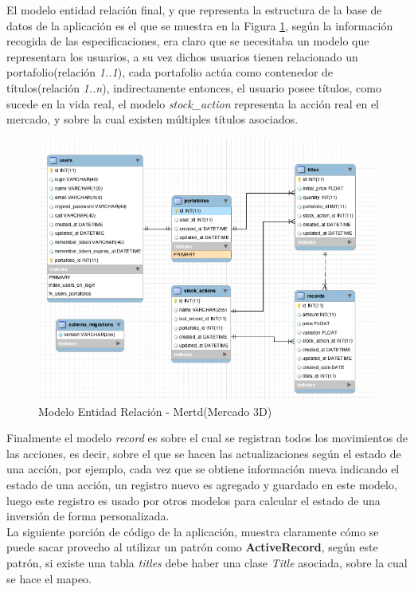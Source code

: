 El modelo entidad relación final, y que representa la estructura de la base de datos de la aplicación es el que se muestra en la Figura \ref{fig:erd}, según la información recogida de las especificaciones, era claro que se necesitaba un modelo que representara los usuarios, a su vez dichos usuarios tienen relacionado un portafolio(relación \emph{1..1}), cada portafolio actúa como contenedor de títulos(relación \emph{1..n}), indirectamente entonces, el usuario posee títulos, como sucede en la vida real, el modelo \emph{stock\_action} representa la acción real en el mercado, y sobre la cual existen múltiples títulos asociados.

\begin{figure}[h]
	\centering
		\includegraphics[scale=0.4]{erb_mertd.jpg}
		\caption{Modelo Entidad Relación - Mertd(Mercado 3D)}
	\label{fig:erd}
\end{figure}

Finalmente el modelo \emph{record} es sobre el cual se registran todos los movimientos de las acciones, es decir, sobre el que se hacen las actualizaciones según el estado de una acción, por ejemplo, cada vez que se obtiene información nueva indicando el estado de una acción, un registro nuevo es agregado y guardado en este modelo, luego este registro es usado por otros modelos para calcular el estado de una inversión de forma personalizada.\\

La siguiente porción de código de la aplicación, muestra claramente cómo se puede sacar provecho al utilizar un patrón como \textbf{ActiveRecord}, según este patrón, si existe una tabla \emph{titles} debe haber una clase \emph{Title} asociada, sobre la cual se hace el mapeo.

